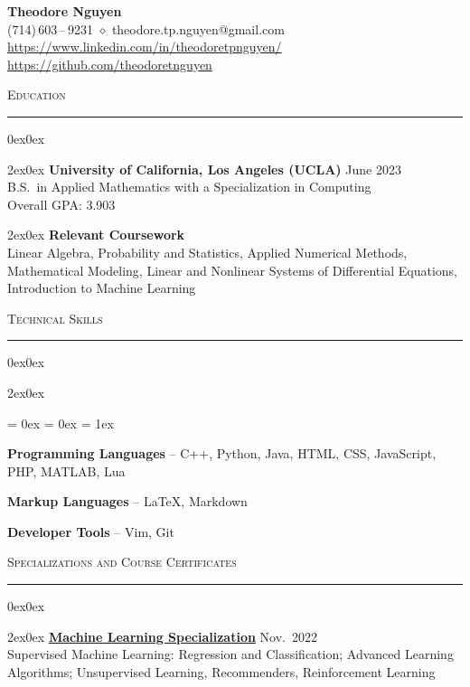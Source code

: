 \documentclass[10pt]{article}
\makeatletter
\newcommand{\rTitle}[1]{{\huge\bfseries #1}\\}
\newcommand{\rPhoneNumber}[3]{(#1)\,#2\,--\,#3}
\newcommand{\rSectionTitle}[1]{{\Large\scshape #1}}
\newcommand{\rEntryTitle}[1]{{\bfseries #1}}
\newcommand{\rEntryDate}[1]{{\mdseries #1}}
\newcommand{\rEntryCompany}[1]{{\itshape #1}}
\newcommand{\rEntryLocation}[1]{{\itshape #1}}
\newcommand{\rMakeTitle}{
\begin{center}
    \rTitle{Theodore Nguyen}
    \vspace{0.75ex}
    \rPhoneNumber{714}{603}{9231} \;$\diamond$\; theodore.tp.nguyen@gmail.com \\
    \url{https://www.linkedin.com/in/theodoretpnguyen/} \\
    \url{https://github.com/theodoretnguyen}
    \vspace{0.5ex}
\end{center}
}
\newenvironment{rSection}[1]
{
    \rSectionTitle{#1}
    \vspace{0.75ex}
    \hrule
    \vspace{0.75ex}
    \begin{adjustwidth}{0ex}{0ex}
}
{
    \end{adjustwidth}
    \vspace{0.8ex}
}
\newenvironment{rEntryWithParagraph}[4]
{
    \begin{adjustwidth}{2ex}{0ex}
    \rEntryTitle{#1} \hfill \rEntryDate{#2}
    \ifthenelse{\equal{#3}{}}{}{
        \\ \rEntryCompany{#3} \hfill \rEntryLocation{#4}
    }
    \vspace{0.25ex} \\
}
{
    \end{adjustwidth}
    \vspace{0.5ex}
}
\newenvironment{rSkills}
{
    \begin{adjustwidth}{2ex}{0ex}
    \begin{list}{}{
        \leftmargin = 0ex
        \topsep = 0ex
        \itemsep = 1ex
    }
}
{
    \end{list}
    \end{adjustwidth}
    \vspace{0.5ex}
}
\makeatother
\begin{document}
\rMakeTitle

\begin{rSection}{Education}
    \begin{rEntryWithParagraph}
        {University of California, Los Angeles (UCLA)}
        {June 2023}
        {}
        {}
        B.S.\ in Applied Mathematics with a Specialization in Computing \\
        Overall GPA: 3.903
    \end{rEntryWithParagraph}
    \begin{rEntryWithParagraph}
        {Relevant Coursework}
        {}
        {}
        {}
        Linear Algebra, Probability and Statistics, Applied Numerical Methods, Mathematical Modeling, Linear and Nonlinear Systems of Differential Equations, Introduction to Machine Learning
    \end{rEntryWithParagraph}
\end{rSection}

\begin{rSection}{Technical Skills}
    \begin{rSkills}
        \item \rEntryTitle{Programming Languages} -- C++, Python, Java, HTML, CSS, JavaScript, PHP, MATLAB, Lua
        \item \rEntryTitle{Markup Languages} -- {\LaTeX}, Markdown
        \item \rEntryTitle{Developer Tools} -- Vim, Git
    \end{rSkills}
\end{rSection}

\begin{rSection}{Specializations and Course Certificates}
    \begin{rEntryWithParagraph}
        {\href{https://www.coursera.org/account/accomplishments/specialization/certificate/A6624TCC8KLB}{Machine Learning Specialization}}
        {Nov.\ 2022}
        {Coursera}
        {}
        Supervised Machine Learning: Regression and Classification; Advanced Learning Algorithms; Unsupervised Learning, Recommenders, Reinforcement Learning
    \end{rEntryWithParagraph}
\end{rSection}
\end{document}
